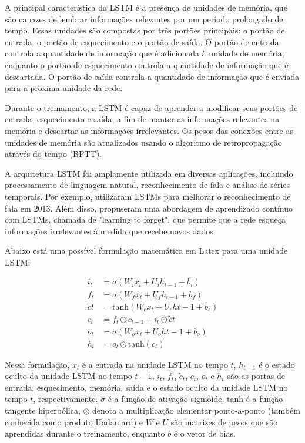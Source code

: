 A principal característica da LSTM é a presença de unidades de memória, que são capazes de lembrar informações relevantes por um período prolongado de tempo. Essas unidades são compostas por três portões principais: o portão de entrada, o portão de esquecimento e o portão de saída. O portão de entrada controla a quantidade de informação que é adicionada à unidade de memória, enquanto o portão de esquecimento controla a quantidade de informação que é descartada. O portão de saída controla a quantidade de informação que é enviada para a próxima unidade da rede.

Durante o treinamento, a LSTM é capaz de aprender a modificar seus portões de entrada, esquecimento e saída, a fim de manter as informações relevantes na memória e descartar as informações irrelevantes. Os pesos das conexões entre as unidades de memória são atualizados usando o algoritmo de retropropagação através do tempo (BPTT).

A arquitetura LSTM foi amplamente utilizada em diversas aplicações, incluindo processamento de linguagem natural, reconhecimento de fala e análise de séries temporais. Por exemplo, \cite{graves2013speech} utilizaram LSTMs para melhorar o reconhecimento de fala em 2013. Além disso, \cite{gers1999learning} propuseram uma abordagem de aprendizado contínuo com LSTMs, chamada de "learning to forget", que permite que a rede esqueça informações irrelevantes à medida que recebe novos dados.

Abaixo está uma possível formulação matemática em Latex para uma unidade LSTM:

\begin{equation}
    \begin{aligned}
        i_t        & = \sigma(W_i x_t + U_i h_{t-1} + b_i)      \\
        f_t        & = \sigma(W_f x_t + U_f h_{t-1} + b_f)      \\
        \tilde{c}t & = \text{tanh}(W_c x_t + U_c h{t-1} + b_c)  \\
        c_t        & = f_t \odot c_{t-1} + i_t \odot \tilde{c}t \\
        o_t        & = \sigma(W_o x_t + U_o h{t-1} + b_o)       \\
        h_t        & = o_t \odot \text{tanh}(c_t)
    \end{aligned}
\end{equation}

Nessa formulação, $x_t$ é a entrada na unidade LSTM no tempo $t$, $h_{t-1}$ é o estado oculto da unidade LSTM no tempo $t-1$, $i_t$, $f_t$, $\tilde{c}_t$, $c_t$, $o_t$ e $h_t$ são as portas de entrada, esquecimento, memória, saída e o estado oculto da unidade LSTM no tempo $t$, respectivamente. $\sigma$ é a função de ativação sigmóide, $\text{tanh}$ é a função tangente hiperbólica, $\odot$ denota a multiplicação elementar ponto-a-ponto (também conhecida como produto Hadamard) e $W$ e $U$ são matrizes de pesos que são aprendidas durante o treinamento, enquanto $b$ é o vetor de bias.

